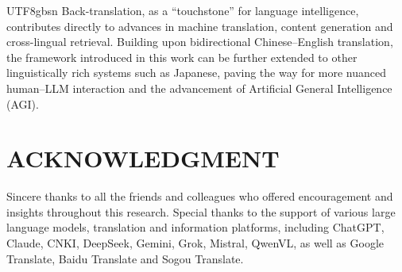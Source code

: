 \documentclass[conference]{IEEEtran}
\begin{document}
\begin{CJK}{UTF8}{gbsn}
Back-translation, as a ``touchstone'' for language intelligence, contributes directly to advances in machine translation, content generation and cross-lingual retrieval. Building upon bidirectional Chinese–English translation, the framework introduced in this work can be further extended to other linguistically rich systems such as Japanese, paving the way for more nuanced human–LLM interaction and the advancement of Artificial General Intelligence (AGI).

\section{ACKNOWLEDGMENT}
Sincere thanks to all the friends and colleagues who offered encouragement and insights throughout this research. Special thanks to the support of various large language models, translation and information platforms, including ChatGPT, Claude, CNKI, DeepSeek, Gemini, Grok, Mistral, QwenVL, as well as Google Translate, Baidu Translate and Sogou Translate.



\end{CJK}
\end{document}
